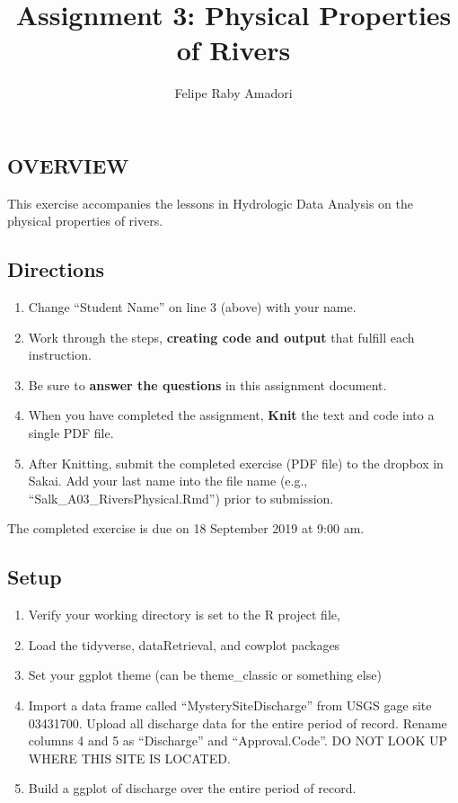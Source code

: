 \documentclass[]{article}
\title{Assignment 3: Physical Properties of Rivers}
\author{Felipe Raby Amadori}
\date{}
\providecommand{\tightlist}{%
  \setlength{\itemsep}{0pt}\setlength{\parskip}{0pt}}
\begin{document}
\maketitle

\hypertarget{overview}{%
\subsection{OVERVIEW}\label{overview}}

This exercise accompanies the lessons in Hydrologic Data Analysis on the
physical properties of rivers.

\hypertarget{directions}{%
\subsection{Directions}\label{directions}}

\begin{enumerate}
\def\labelenumi{\arabic{enumi}.}
\tightlist
\item
  Change ``Student Name'' on line 3 (above) with your name.
\item
  Work through the steps, \textbf{creating code and output} that fulfill
  each instruction.
\item
  Be sure to \textbf{answer the questions} in this assignment document.
\item
  When you have completed the assignment, \textbf{Knit} the text and
  code into a single PDF file.
\item
  After Knitting, submit the completed exercise (PDF file) to the
  dropbox in Sakai. Add your last name into the file name (e.g.,
  ``Salk\_A03\_RiversPhysical.Rmd'') prior to submission.
\end{enumerate}

The completed exercise is due on 18 September 2019 at 9:00 am.

\hypertarget{setup}{%
\subsection{Setup}\label{setup}}

\begin{enumerate}
\def\labelenumi{\arabic{enumi}.}
\tightlist
\item
  Verify your working directory is set to the R project file,
\item
  Load the tidyverse, dataRetrieval, and cowplot packages
\item
  Set your ggplot theme (can be theme\_classic or something else)
\item
  Import a data frame called ``MysterySiteDischarge'' from USGS gage
  site 03431700. Upload all discharge data for the entire period of
  record. Rename columns 4 and 5 as ``Discharge'' and ``Approval.Code''.
  DO NOT LOOK UP WHERE THIS SITE IS LOCATED.
\item
  Build a ggplot of discharge over the entire period of record.
\end{enumerate}
\end{document}
